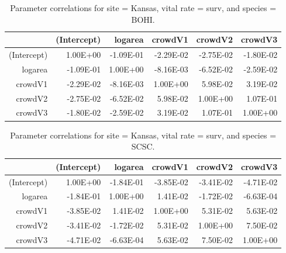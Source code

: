 \documentclass[12pt,]{article}
\begin{document}
\begin{table}[ht]
\centering
\caption{Parameter correlations for site = Kansas, vital rate = surv, and species = BOHI.} 
\begin{tabular}{rrrrrr}
  \hline
 & (Intercept) & logarea & crowdV1 & crowdV2 & crowdV3 \\ 
  \hline
(Intercept) & 1.00E+00 & -1.09E-01 & -2.29E-02 & -2.75E-02 & -1.80E-02 \\ 
  logarea & -1.09E-01 & 1.00E+00 & -8.16E-03 & -6.52E-02 & -2.59E-02 \\ 
  crowdV1 & -2.29E-02 & -8.16E-03 & 1.00E+00 & 5.98E-02 & 3.19E-02 \\ 
  crowdV2 & -2.75E-02 & -6.52E-02 & 5.98E-02 & 1.00E+00 & 1.07E-01 \\ 
  crowdV3 & -1.80E-02 & -2.59E-02 & 3.19E-02 & 1.07E-01 & 1.00E+00 \\ 
   \hline
\end{tabular}
\end{table}

\begin{table}[ht]
\centering
\caption{Parameter correlations for site = Kansas, vital rate = surv, and species = SCSC.} 
\begin{tabular}{rrrrrr}
  \hline
 & (Intercept) & logarea & crowdV1 & crowdV2 & crowdV3 \\ 
  \hline
(Intercept) & 1.00E+00 & -1.84E-01 & -3.85E-02 & -3.41E-02 & -4.71E-02 \\ 
  logarea & -1.84E-01 & 1.00E+00 & 1.41E-02 & -1.72E-02 & -6.63E-04 \\ 
  crowdV1 & -3.85E-02 & 1.41E-02 & 1.00E+00 & 5.31E-02 & 5.63E-02 \\ 
  crowdV2 & -3.41E-02 & -1.72E-02 & 5.31E-02 & 1.00E+00 & 7.50E-02 \\ 
  crowdV3 & -4.71E-02 & -6.63E-04 & 5.63E-02 & 7.50E-02 & 1.00E+00 \\ 
   \hline
\end{tabular}
\end{table}

\newpage{}
\end{document}
